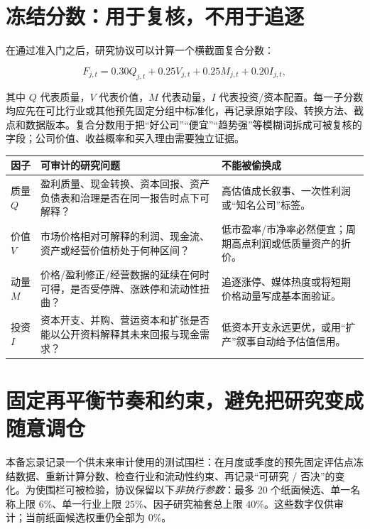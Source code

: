 \section{冻结分数：用于复核，不用于追逐}

在通过准入门之后，研究协议可以计算一个横截面复合分数：

\[
F_{j,t}=0.30Q_{j,t}+0.25V_{j,t}+0.25M_{j,t}+0.20I_{j,t},
\]

其中 \(Q\) 代表质量，\(V\) 代表价值，\(M\) 代表动量，\(I\) 代表投资/资本配置。每一子分数均应先在可比行业或其他预先固定分组中标准化，再记录原始字段、转换方法、截点和数据版本。复合分数用于把“好公司”“便宜”“趋势强”等模糊词拆成可被复核的字段；公司价值、收益概率和买入理由需要独立证据。

\begin{dashboardbox}[四类因子的纸面定义与常见误用]
\begin{tabularx}{\textwidth}{L{2.0cm}X L{4.2cm}}
\toprule
\textbf{因子} & \textbf{可审计的研究问题} & \textbf{不能被偷换成} \\
\midrule
质量 \(Q\) & 盈利质量、现金转换、资本回报、资产负债表和治理是否在同一报告时点下可解释？ & 高估值成长叙事、一次性利润或“知名公司”标签。 \\
价值 \(V\) & 市场价格相对可解释的利润、现金流、资产或经营价值桥处于何种区间？ & 低市盈率/市净率必然便宜；周期高点利润或低质量资产的折价。 \\
动量 \(M\) & 价格/盈利修正/经营数据的延续在何时可得，是否受停牌、涨跌停和流动性扭曲？ & 追逐涨停、媒体热度或将短期价格动量写成基本面验证。 \\
投资 \(I\) & 资本开支、并购、营运资本和扩张是否能以公开资料解释其未来回报与现金需求？ & 低资本开支永远更优，或用“扩产”叙事自动给予估值信用。 \\
\bottomrule
\end{tabularx}
\end{dashboardbox}

\section{固定再平衡节奏和约束，避免把研究变成随意调仓}

本备忘录记录一个供未来审计使用的测试围栏：在月度或季度的预先固定评估点冻结数据、重新计算分数、检查行业和流动性约束、再记录“可研究 / 否决”的变化。为使围栏可被检验，协议保留以下\emph{非执行参数}：最多 20 个纸面候选、单一名称上限 \(6\%\)、单一行业上限 \(25\%\)、因子研究袖套总上限 \(40\%\)。这些数字仅供审计；当前纸面候选权重仍全部为 \(0\%\)。

